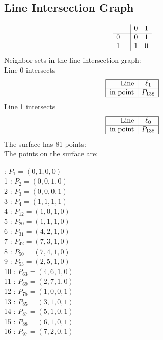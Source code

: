 \documentclass{article}
\begin{document}
{\subsection*{Line Intersection Graph}
{\arraycolsep=1pt
$$
\begin{array}{rr|*{2}r}
 &  & 0 & 1\\
\hline
0 &  & 0 & 1\\
1 &  & 1 & 0\\
\end{array}
$$
}%
Neighbor sets in the line intersection graph:\\
Line 0 intersects 
$$
\begin{array}{|r*{1}{|c}|}
\hline
\mbox{Line}  & \ell_{1}\\
\hline
\mbox{in point}  & P_{138}\\
\hline
\end{array}
$$
Line 1 intersects 
$$
\begin{array}{|r*{1}{|c}|}
\hline
\mbox{Line}  & \ell_{0}\\
\hline
\mbox{in point}  & P_{138}\\
\hline
\end{array}
$$
The surface has 81 points:\\
The points on the surface are:\\
\begin{multicols}{3}
 : $P_{1}=( 0, 1, 0, 0 )$\\
1 : $P_{2}=( 0, 0, 1, 0 )$\\
2 : $P_{3}=( 0, 0, 0, 1 )$\\
3 : $P_{4}=( 1, 1, 1, 1 )$\\
4 : $P_{12}=( 1, 0, 1, 0 )$\\
5 : $P_{20}=( 1, 1, 1, 0 )$\\
6 : $P_{31}=( 4, 2, 1, 0 )$\\
7 : $P_{42}=( 7, 3, 1, 0 )$\\
8 : $P_{50}=( 7, 4, 1, 0 )$\\
9 : $P_{53}=( 2, 5, 1, 0 )$\\
10 : $P_{63}=( 4, 6, 1, 0 )$\\
11 : $P_{69}=( 2, 7, 1, 0 )$\\
12 : $P_{75}=( 1, 0, 0, 1 )$\\
13 : $P_{85}=( 3, 1, 0, 1 )$\\
14 : $P_{87}=( 5, 1, 0, 1 )$\\
15 : $P_{88}=( 6, 1, 0, 1 )$\\
16 : $P_{97}=( 7, 2, 0, 1 )$\\

\end{multicols}}
\end{document}
